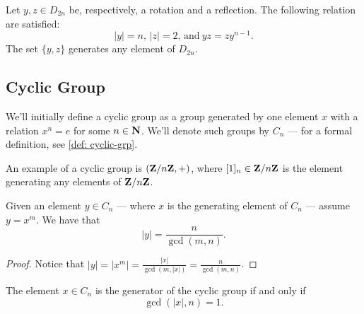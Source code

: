 \begin{corollary}
    Let \(y, z \in D_{2n}\) be, respectively, a rotation and a reflection. The
    following relation are satisfied:
    \[
        |y| = n \text{, } |z| = 2 \text{, and}\ yz = z y^{n-1}.
    \]
    The set \(\{y, z\}\) generates any element of \(D_{2n}\).
\end{corollary}

\subsection{Cyclic Group}

We'll initially define a cyclic group as a group generated by one element \(x\)
with a relation \(x^n = e\) for some \(n \in \mathbf{N}\). We'll denote such groups by
\(C_n\) --- for a formal definition, see \cref{def: cyclic-grp}.

\begin{example}
    An example of a cyclic group is \((\mathbf{Z}/n\mathbf{Z}, +)\), where \([1]_n \in \mathbf{Z}/n\mathbf{Z}\) is
    the element generating any elements of \(\mathbf{Z}/n\mathbf{Z}\).
\end{example}

\begin{proposition}\label{prop: ord-cyclic-elem}
    Given an element \(y \in C_n\) --- where \(x\) is the generating element of
    \(C_n\) --- assume \(y = x^m\). We have that
    \[
        |y| = \frac n {\operatorname{gcd}(m, n)}.
    \]
\end{proposition}

\begin{proof}
    Notice that \(|y| = |x^m| = \frac{|x|}{\operatorname{gcd}(m, |x|)} = \frac n
        {\operatorname{gcd}(m, n)}\).
\end{proof}

\begin{corollary}
    The element \(x \in C_n\) is the generator of the cyclic group if and only if
    \[
        \operatorname{gcd}(|x|, n) = 1.
    \]
\end{corollary}
